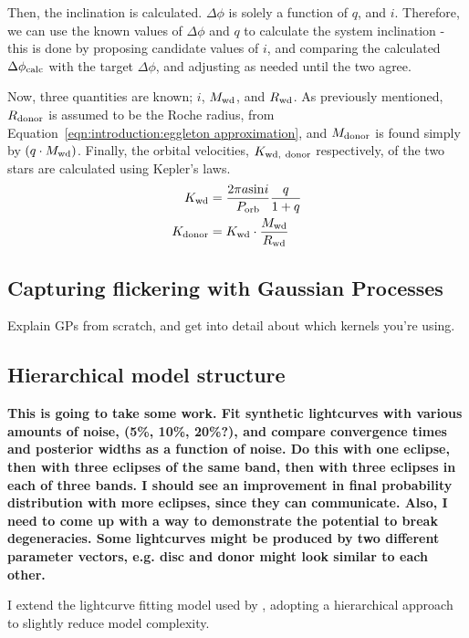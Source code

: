 Then, the inclination is calculated. $\Delta \phi$ is solely a function of $q$, and $i$. Therefore, we can use the known values of $\Delta\phi$ and $q$ to calculate the system inclination - this is done by proposing candidate values of $i$, and comparing the calculated $\Delta \phi_{\rm calc}$ with the target $\Delta \phi$, and adjusting as needed until the two agree.

Now, three quantities are known; $i$, $M_{\rm wd}$, and $R_{\rm wd}$. As previously mentioned, $R_{\rm donor}$ is assumed to be the Roche radius, from Equation~\ref{eqn:introduction:eggleton approximation}, and $M_{\rm donor}$ is found simply by $(q \cdot M_{\rm wd})$. Finally, the orbital velocities, $K_{\rm wd,\ donor}$ respectively, of the two stars are calculated using Kepler's laws.
\begin{align}
    K_{\rm wd} &= \frac{2\pi a \mathrm{sin}i}{P_{\rm orb}} \frac{q}{1+q} \\
    K_{\rm donor} &= K_{\rm wd} \cdot \frac{M_{\rm wd}}{R_{\rm wd}}
\end{align}


\subsection{Capturing flickering with Gaussian Processes}
Explain GPs from scratch, and get into detail about which kernels you're using.


\subsection{Hierarchical model structure}
{\bf This is going to take some work. Fit synthetic lightcurves with various amounts of noise, (5\%, 10\%, 20\%?), and compare convergence times and posterior widths as a function of noise. Do this with one eclipse, then with three eclipses of the same band, then with three eclipses in each of three bands.
I should see an improvement in final probability distribution with more eclipses, since they can communicate.
Also, I need to come up with a way to demonstrate the potential to break degeneracies. Some lightcurves might be produced by two different parameter vectors, e.g. disc and donor might look similar to each other. }

I extend the lightcurve fitting model used by \citet{McAllister2019}, adopting a hierarchical approach to slightly reduce model complexity.

